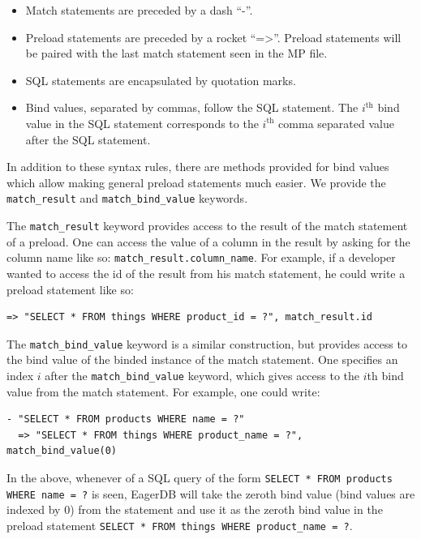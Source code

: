 \documentclass[12pt]{article}
\begin{document}
\begin{itemize}
  \item Match statements are preceded by a dash ``-''.
  \item Preload statements are preceded by a rocket ``=\textgreater''. Preload statements will be paired with the last match statement seen in the MP file.
  \item SQL statements are encapsulated by quotation marks.
  \item Bind values, separated by commas, follow the SQL statement. The $i^{\textrm{th}}$ bind value in the SQL statement corresponds to the $i^{\textrm{th}}$ comma separated value after the SQL statement.
\end{itemize}

In addition to these syntax rules, there are methods provided for bind values which allow making general preload statements much easier. We provide the \texttt{match\_result} and \texttt{match\_bind\_value} keywords.

The \texttt{match\_result} keyword provides access to the result of the match statement of a preload. One can access the value of a column in the result by asking for the column name like so: \texttt{match\_result.column\_name}. For example, if a developer wanted to access the id of the result from his match statement, he could write a preload statement like so:

\begin{lstlisting}
=> "SELECT * FROM things WHERE product_id = ?", match_result.id
\end{lstlisting}

The \texttt{match\_bind\_value} keyword is a similar construction, but provides access to the bind value of the binded instance of the match statement. One specifies an index $i$ after the \texttt{match\_bind\_value} keyword, which gives access to the $i$th bind value from the match statement. For example, one could write:

\begin{lstlisting}
- "SELECT * FROM products WHERE name = ?"
  => "SELECT * FROM things WHERE product_name = ?", match_bind_value(0)
\end{lstlisting}

In the above, whenever of a SQL query of the form \texttt{SELECT * FROM products WHERE name = ?} is seen, EagerDB will take the zeroth bind value (bind values are indexed by 0) from the statement and use it as the zeroth bind value in the preload statement \texttt{SELECT * FROM things WHERE product\_name = ?}.
\end{document}
